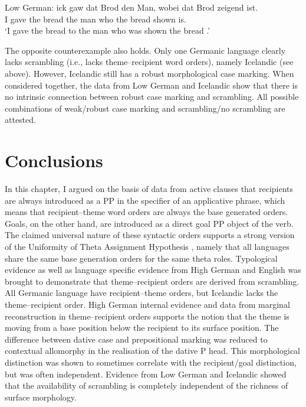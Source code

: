 \begin{exe}
	 Low German:
	\gll ick gaw dat Brod den Man, wobei dat Brod zeigend ist.\\
	I gave the bread the man who the bread shown is.\\
	\trans `I gave the bread to the man who was shown the bread \citep{Mussaus.1829}.'
\end{exe}

The opposite counterexample also holds. Only one Germanic language clearly lacks scrambling (i.e., lacks theme--recipient word orders), namely Icelandic (see above). However, Icelandic still has a robust morphological case marking. When considered together, the data from Low German and Icelandic show that there is no intrinsic connection between robust case marking and scrambling. All possible combinations of weak/robust case marking and scrambling/no scrambling are attested.

\section{Conclusions}
In this chapter, I argued on the basis of data from active clauses that recipients are always introduced as a PP in the specifier of an applicative phrase, which means that recipient--theme word orders are always the base generated orders. Goals, on the other hand, are introduced as a direct goal PP object of the verb. The claimed universal nature of these syntactic orders supports a strong version of the Uniformity of Theta Assignment Hypothesis \citep{Baker.1988}, namely that all languages share the same base generation orders for the same theta roles.
	Typological evidence as well as language specific evidence from High German and English was brought to demonstrate that theme--recipient orders are derived from scrambling. All Germanic language have recipient--theme orders, but Icelandic lacks the theme--recipient order. High German internal evidence and data from marginal reconstruction in theme--recipient orders supports the notion that the theme is moving from a base position below the recipient to its surface position.
	The difference between dative case and prepositional marking was reduced to contextual allomorphy in the realisation of the dative P head. This morphological distinction was shown to sometimes correlate with the recipient/goal distinction, but was often independent. Evidence from Low German and Icelandic showed that the availability of scrambling is completely independent of the richness of surface morphology.

%
